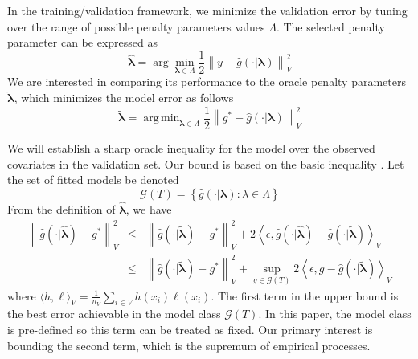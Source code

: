 \documentclass[12pt]{article}
\DeclareMathOperator*{\argmin}{arg\,min}
\begin{document}
In the training/validation framework, we minimize the validation error by tuning over the range of possible penalty parameters values $\Lambda$. The selected penalty parameter can be expressed as
\begin{equation}
\label{cv_lambda}
\hat{\boldsymbol \lambda} = \arg\min_{\boldsymbol{\lambda} \in\Lambda} \frac{1}{2} \left \| y-\hat{g}(\cdot | \boldsymbol \lambda) \right \|_{V}^{2}
\end{equation}
We are interested in comparing its performance to the oracle penalty parameters $\tilde{\boldsymbol \lambda}$, which minimizes the model error as follows
\begin{equation}
\tilde{\boldsymbol \lambda} = \argmin_{\boldsymbol{\lambda} \in \Lambda} \frac{1}{2} \left \| g^* - \hat{g}(\cdot | \boldsymbol \lambda) \right \|^2_V
\end{equation}

We will establish a sharp oracle inequality for the model over the observed covariates in the validation set. Our bound is based on the basic inequality \citep{van2000empirical}.  Let the set of fitted models be denoted
\begin{equation}
\label{function_class_GT}
\mathcal{G}(T) = \left \{ \hat{g}(\cdot | \boldsymbol \lambda) : \lambda \in \Lambda  \right \}
\end{equation}
From the definition of $\hat{\boldsymbol \lambda}$, we have
\begin{eqnarray}
\label{basic_ineq}
\left \|\hat{g}(\cdot | \hat{\boldsymbol \lambda}) - g^* \right \|_V^2
& \le &
\left \| \hat{g}(\cdot | \tilde{\boldsymbol \lambda}) - g^* \right \|_V^2 +
2 \left \langle \epsilon, \hat{g}(\cdot | \hat{\boldsymbol \lambda}) - \hat{g}(\cdot | \tilde{\boldsymbol \lambda}) \right \rangle_V \\
& \le &
\left \| \hat{g}(\cdot | \tilde{\boldsymbol \lambda}) - g^* \right \|_V^2 +
\sup_{g \in \mathcal{G}(T)} 2 \left \langle \epsilon, g - \hat{g}(\cdot | \tilde{\boldsymbol \lambda}) \right \rangle_V
\label{eq:basic_ineq_emp_process}
\end{eqnarray}
where $\langle h, \ell \rangle_V = \frac{1}{n_V}\sum_{i\in V} h(x_i) \ell(x_i)$. The first term in the upper bound is the best error achievable in the model class $\mathcal{G}(T)$. In this paper, the model class is pre-defined so this term can be treated as fixed. Our primary interest is bounding the second term, which is the supremum of empirical processes.
\end{document}
